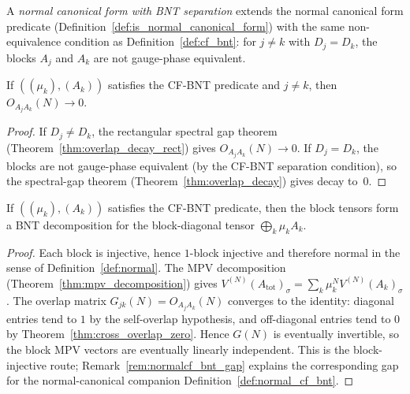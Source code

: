 \begin{definition}\label{def:normal_cf_bnt}
		\leanok
		A \emph{normal canonical form with BNT separation} extends the normal
		canonical form predicate (Definition~\ref{def:is_normal_canonical_form})
		with the same non-equivalence condition as Definition~\ref{def:cf_bnt}:
		for $j \neq k$ with $D_j = D_k$, the blocks $A_j$ and $A_k$ are not
		gauge-phase equivalent.
\end{definition}

\begin{theorem}\label{thm:cross_overlap_zero}
	\leanok
	If $((\mu_k),(A_k))$ satisfies the CF-BNT predicate and
	$j \neq k$, then $O_{A_j A_k}(N) \to 0$.
\end{theorem}

\begin{proof}\leanok{}
	If $D_j \neq D_k$, the rectangular spectral gap theorem
	(Theorem~\ref{thm:overlap_decay_rect}) gives
	$O_{A_j A_k}(N) \to 0$.
	If $D_j = D_k$, the blocks are not gauge-phase
	equivalent (by the CF-BNT separation condition),
	so the spectral-gap theorem
	(Theorem~\ref{thm:overlap_decay}) gives decay to~$0$.
\end{proof}

\begin{theorem}\label{thm:cf_bnt_is_bnt}
	\leanok
	If $((\mu_k), (A_k))$ satisfies the CF-BNT predicate, then
	the block tensors form a BNT decomposition for the
	block-diagonal tensor $\bigoplus_k \mu_k A_k$.
\end{theorem}

\begin{proof}
		\leanok
		Each block is injective, hence $1$-block injective and therefore
		normal in the sense of Definition~\ref{def:normal}.
		The MPV decomposition (Theorem~\ref{thm:mpv_decomposition}) gives
		$V^{(N)}(A_{\mathrm{tot}})_\sigma = \sum_k \mu_k^N V^{(N)}(A_k)_\sigma$.
		The overlap matrix $G_{jk}(N) = O_{A_j A_k}(N)$ converges to the
		identity: diagonal entries tend to $1$ by the self-overlap
		hypothesis, and off-diagonal entries tend to $0$ by
		Theorem~\ref{thm:cross_overlap_zero}.
		Hence $G(N)$ is eventually invertible, so the block MPV vectors are
		eventually linearly independent. This is the block-injective route;
		Remark~\ref{rem:normalcf_bnt_gap} explains the corresponding gap for
		the normal-canonical companion Definition~\ref{def:normal_cf_bnt}.
\end{proof}

